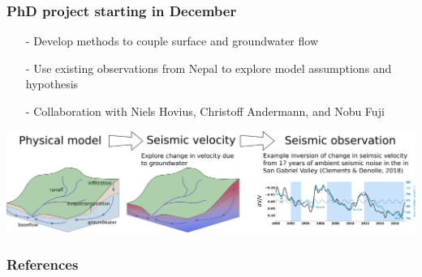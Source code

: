 \documentclass[aspectratio=169]{beamer}
\begin{document}
\begin{frame}
    \frametitle{PhD project starting in December}
    \begin{itemize}
        \item[-]{Develop methods to couple surface and groundwater flow}
        \item[-]{Use existing observations from Nepal to explore model assumptions and hypothesis}
        \item[-]{Collaboration with Niels Hovius, Christoff Andermann, and Nobu Fuji}
    \end{itemize}
    \includegraphics[width=0.9\paperwidth]{./figures/groundwater.svg.png}
\end{frame}

\begin{frame}
    \frametitle{References}
    {\tiny
    
    
    }
\end{frame}
\end{document}
